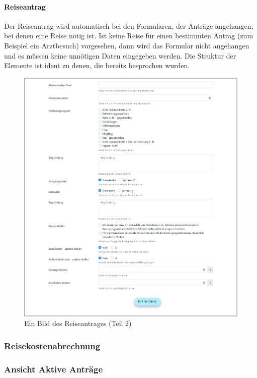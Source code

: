 \paragraph{Reiseantrag}
Der Reiseantrag wird automatisch bei den Formularen, der Anträge angehangen, bei denen eine Reise nötig ist. Ist keine Reise für einen bestimmten Antrag (zum Beispiel ein Arztbesuch) vorgesehen, dann wird das Formular nicht angehangen und es müssen keine unnötigen Daten eingegeben werden. Die Struktur der Elemente ist ident zu denen, die bereits besprochen wurden.
\begin{figure}[H]
	\centering
	\includegraphics[width=1\linewidth]{images/website/zusatz_1}
	\caption[Neuer Schulantrag]{Ein Bild des Reiseantrages (Teil 2)}
	\label{fig:zusatz1}
\end{figure}

\subsubsection{Reisekostenabrechnung}


\newpage
\subsubsection{Ansicht Aktive Anträge}

